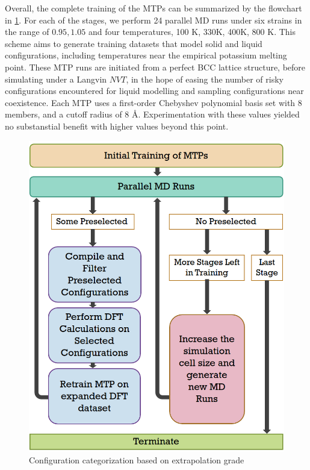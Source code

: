 \documentclass[9pt,twocolumn,twoside]{opticajnl}
\begin{document}
Overall, the complete training of the MTPs can be summarized by the flowchart in \ref{fig:scheme}. For each of the stages, we perform 24 parallel MD runs under six strains in the range of ${0.95, 1.05}$ and four temperatures, 100 K, 330K, 400K, 800 K. This scheme aims to generate training datasets that model solid and liquid configurations, including temperatures near the empirical potassium melting point. These MTP runs are initiated from a perfect BCC lattice structure, before simulating under a Langvin $NVT$, in the hope of easing the number of risky configurations encountered for liquid modelling and sampling configurations near coexistence. Each MTP uses a first-order Chebyshev polynomial basis set with 8 members, and a cutoff radius of 8 Å. Experimentation with these values yielded no substanstial benefit with higher values beyond this point.  

\begin{figure}[ht]
  \centering
  \includegraphics[width=\linewidth]{assets/trainingScheme.png}
  \caption{Configuration categorization based on extrapolation grade}
  \label{fig:scheme}
\end{figure}
\end{document}
